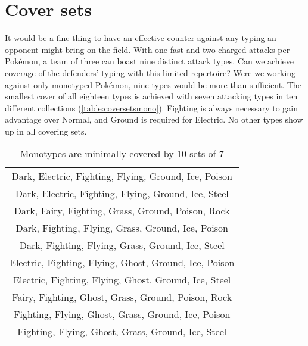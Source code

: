 \section{Cover sets}
It would be a fine thing to have an effective counter against any typing
  an opponent might bring on the field.
With one fast and two charged attacks per Pokémon, a team of three can boast nine distinct attack types.
Can we achieve coverage of the defenders' typing with this limited repertoire?
Were we working against only monotyped Pokémon, nine types would be more than sufficient.
The smallest cover of all eighteen types is achieved with seven attacking types in
  ten different collections (\autoref{table:coversetsmono}).
Fighting is always necessary to gain advantage over Normal, and Ground is required for Electric.
No other types show up in all covering sets.
\begin{table}[ht]
\begin{centering}
  \begin{tabular}{c}
 Dark, Electric, Fighting, Flying, Ground, Ice, Poison\\
 Dark, Electric, Fighting, Flying, Ground, Ice, Steel\\
 Dark, Fairy, Fighting, Grass, Ground, Poison, Rock\\
 Dark, Fighting, Flying, Grass, Ground, Ice, Poison\\
 Dark, Fighting, Flying, Grass, Ground, Ice, Steel\\
 Electric, Fighting, Flying, Ghost, Ground, Ice, Poison\\
 Electric, Fighting, Flying, Ghost, Ground, Ice, Steel\\
 Fairy, Fighting, Ghost, Grass, Ground, Poison, Rock\\
 Fighting, Flying, Ghost, Grass, Ground, Ice, Poison\\
 Fighting, Flying, Ghost, Grass, Ground, Ice, Steel\\
  \end{tabular}
  \caption{Monotypes are minimally covered by 10 sets of 7}
  \label{table:coversetsmono}
\end{centering}
\end{table}

